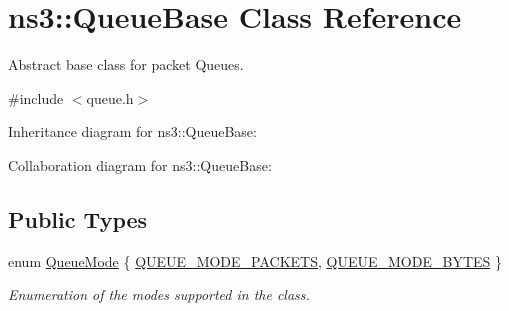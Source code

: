 \hypertarget{classns3_1_1QueueBase}{}\section{ns3\+:\+:Queue\+Base Class Reference}
\label{classns3_1_1QueueBase}


Abstract base class for packet Queues.  




{\ttfamily \#include $<$queue.\+h$>$}



Inheritance diagram for ns3\+:\+:Queue\+Base\+:


Collaboration diagram for ns3\+:\+:Queue\+Base\+:
\subsection*{Public Types}
\begin{DoxyCompactItemize}
\item 
enum \hyperlink{classns3_1_1QueueBase_adc473162c2a2bcb3d76d151d6d7ee02a}{Queue\+Mode} \{ \hyperlink{classns3_1_1QueueBase_adc473162c2a2bcb3d76d151d6d7ee02aa68a809be7a09a4c4c7d8feb37f2f7a9d}{Q\+U\+E\+U\+E\+\_\+\+M\+O\+D\+E\+\_\+\+P\+A\+C\+K\+E\+TS}, 
\hyperlink{classns3_1_1QueueBase_adc473162c2a2bcb3d76d151d6d7ee02aa141eeb76bf0704ba0fdb23b04ffc3453}{Q\+U\+E\+U\+E\+\_\+\+M\+O\+D\+E\+\_\+\+B\+Y\+T\+ES}
 \}\begin{DoxyCompactList}\small\item\em Enumeration of the modes supported in the class. \end{DoxyCompactList}
\end{DoxyCompactItemize}
